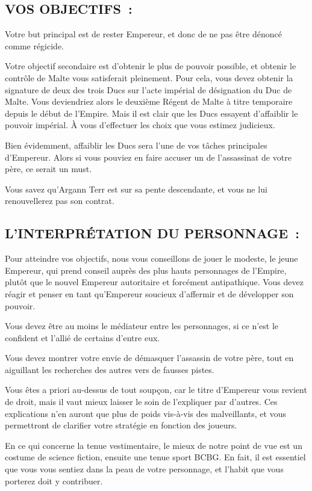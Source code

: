 \documentclass[14pt,twocolumn]{extarticle}
\begin{document}
\subsection{VOS OBJECTIFS~:}

Votre but principal est de rester Empereur, et donc de ne pas être dénoncé
comme régicide.

Votre objectif secondaire est d'obtenir le plus de pouvoir possible, et obtenir
le contrôle de Malte vous satisferait pleinement. Pour cela, vous devez obtenir
la signature de deux des trois Ducs sur l'acte impérial de désignation du Duc
de Malte. Vous deviendriez alors le deuxième Régent de Malte à titre temporaire
depuis le début de l'Empire. Mais il est clair que les Ducs essayent
d'affaiblir le pouvoir impérial. À vous d'effectuer les choix que vous estimez
judicieux.

Bien évidemment, affaiblir les Ducs sera l'une de vos tâches principales
d'Empereur. Alors si vous pouviez en faire accuser un de l'assassinat de votre
père, ce serait un must.

Vous savez qu'Argann Terr est sur sa pente descendante, et vous ne lui
renouvellerez pas son contrat.

\subsection{L'INTERPRÉTATION DU PERSONNAGE~:}

Pour atteindre vos objectifs, nous vous conseillons de jouer le modeste, le
jeune Empereur, qui prend conseil auprès des plus hauts personnages de
l'Empire, plutôt que le nouvel Empereur autoritaire et forcément antipathique.
Vous devez réagir et penser en tant qu'Empereur soucieux d'affermir et de
développer son pouvoir.

Vous devez être au moins le médiateur entre les personnages, si ce n'est le
confident et l'allié de certains d'entre eux.

Vous devez montrer votre envie de démasquer l'assassin de votre père, tout en
aiguillant les recherches des autres vers de fausses pistes.

Vous êtes a priori au-dessus de tout soupçon, car le titre d'Empereur vous
revient de droit, mais il vaut mieux laisser le soin de l'expliquer par
d'autres. Ces explications n'en auront que plus de poids vis-à-vis des
malveillants, et vous permettront de clarifier votre stratégie en fonction des
joueurs.

En ce qui concerne la tenue vestimentaire, le mieux de notre point de vue est
un costume de science fiction, ensuite une tenue sport BCBG. En fait, il est
essentiel que vous vous sentiez dans la peau de votre personnage, et l'habit
que vous porterez doit y contribuer.
\end{document}
